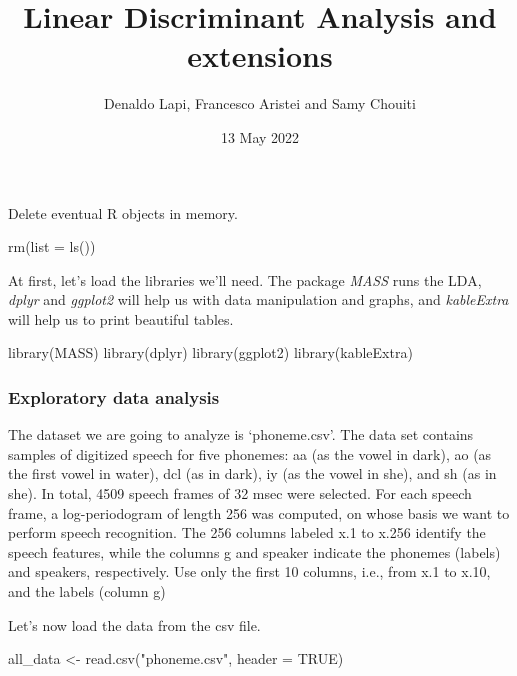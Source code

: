 \documentclass[
]{article}
\title{Linear Discriminant Analysis and extensions}
\author{Denaldo Lapi, Francesco Aristei and Samy Chouiti}
\date{13 May 2022}
\newenvironment{Shaded}{\begin{snugshade}}{\end{snugshade}}
\newcommand{\AttributeTok}[1]{\textcolor[rgb]{0.77,0.63,0.00}{#1}}
\newcommand{\ConstantTok}[1]{\textcolor[rgb]{0.00,0.00,0.00}{#1}}
\newcommand{\FunctionTok}[1]{\textcolor[rgb]{0.00,0.00,0.00}{#1}}
\newcommand{\NormalTok}[1]{#1}
\newcommand{\OtherTok}[1]{\textcolor[rgb]{0.56,0.35,0.01}{#1}}
\newcommand{\StringTok}[1]{\textcolor[rgb]{0.31,0.60,0.02}{#1}}
\begin{document}
\maketitle

Delete eventual R objects in memory.

\begin{Shaded}
\begin{Highlighting}[]
\FunctionTok{rm}\NormalTok{(}\AttributeTok{list =} \FunctionTok{ls}\NormalTok{())}
\end{Highlighting}
\end{Shaded}

At first, let's load the libraries we'll need. The package \emph{MASS}
runs the LDA, \emph{dplyr} and \emph{ggplot2} will help us with data
manipulation and graphs, and \emph{kableExtra} will help us to print
beautiful tables.

\begin{Shaded}
\begin{Highlighting}[]
\FunctionTok{library}\NormalTok{(MASS)}
\FunctionTok{library}\NormalTok{(dplyr)}
\FunctionTok{library}\NormalTok{(ggplot2)}
\FunctionTok{library}\NormalTok{(kableExtra)}
\end{Highlighting}
\end{Shaded}

\hypertarget{exploratory-data-analysis}{%
\subsubsection{Exploratory data
analysis}\label{exploratory-data-analysis}}

The dataset we are going to analyze is `phoneme.csv'. The data set
contains samples of digitized speech for five phonemes: aa (as the vowel
in dark), ao (as the first vowel in water), dcl (as in dark), iy (as the
vowel in she), and sh (as in she). In total, 4509 speech frames of 32
msec were selected. For each speech frame, a log-periodogram of length
256 was computed, on whose basis we want to perform speech recognition.
The 256 columns labeled x.1 to x.256 identify the speech features, while
the columns g and speaker indicate the phonemes (labels) and speakers,
respectively. Use only the first 10 columns, i.e., from x.1 to x.10, and
the labels (column g)

Let's now load the data from the csv file.

\begin{Shaded}
\begin{Highlighting}[]
\NormalTok{all\_data }\OtherTok{\textless{}{-}} \FunctionTok{read.csv}\NormalTok{(}\StringTok{"phoneme.csv"}\NormalTok{, }\AttributeTok{header =} \ConstantTok{TRUE}\NormalTok{)}
\end{Highlighting}
\end{Shaded}
\end{document}
